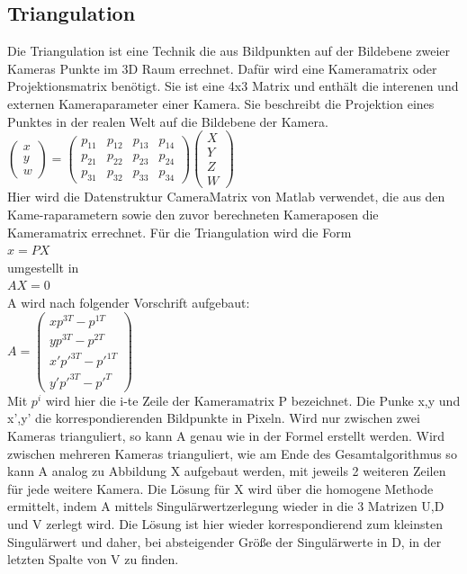 \subsection{Triangulation}
Die Triangulation ist eine Technik die aus Bildpunkten auf der Bildebene zweier Kameras Punkte im 3D Raum errechnet. Dafür wird eine Kameramatrix oder Projektionsmatrix benötigt. Sie ist eine 4x3 Matrix und enthält die interenen und externen Kameraparameter einer Kamera.  Sie beschreibt die Projektion eines Punktes in der realen Welt auf die Bildebene der Kamera.
\\
$ \begin{pmatrix} x\\y\\w \end{pmatrix} =  \begin{pmatrix} p_11 & p_12 & p_13 & p_14\\  p_21 & p_22 & p_23 & p_24 \\  p_31 & p_32 & p_33 & p_34  \end{pmatrix} \begin{pmatrix} X\\Y\\Z\\W \end{pmatrix}$
\\
Hier wird die Datenstruktur CameraMatrix von Matlab verwendet, die aus den Kame-raparametern sowie den zuvor berechneten Kameraposen die Kameramatrix errechnet.
Für die Triangulation wird die Form
\\
$x = PX$
\\
umgestellt in
\\
$AX = 0$
\\
A wird nach folgender Vorschrift aufgebaut:
\\
$A = \begin{pmatrix} xp^{3T} - p^{1T} \\ yp^{3T} - p^{2T} \\ x'p'^{3T} - p'^{1T} \\ y'p'^{3T} - p'^{T} \end{pmatrix}$
\\
Mit $p^i$ wird hier die i-te Zeile der Kameramatrix P bezeichnet. Die Punke x,y und x’,y’ die korrespondierenden Bildpunkte in Pixeln. Wird nur zwischen zwei Kameras trianguliert, so kann A genau wie in der Formel erstellt werden. Wird zwischen mehreren Kameras trianguliert, wie am Ende des Gesamtalgorithmus so kann A analog zu Abbildung X aufgebaut werden, mit jeweils 2 weiteren Zeilen für jede weitere Kamera.
Die Lösung für X wird über die homogene Methode ermittelt, indem A mittels Singulärwertzerlegung wieder in die 3 Matrizen U,D und V zerlegt wird. Die Lösung ist hier wieder korrespondierend zum kleinsten Singulärwert und daher, bei absteigender Größe der Singulärwerte in D,  in der letzten Spalte von V zu finden.


\clearpage

